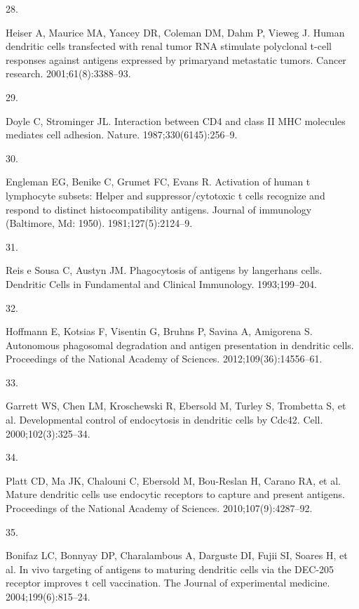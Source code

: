 \documentclass[
]{article}
\newlength{\cslhangindent}
\newlength{\csllabelwidth}
\newenvironment{CSLReferences}[2] %
 {\begin{list}{}{%
  \setlength{\itemindent}{0pt}
  \setlength{\leftmargin}{0pt}
  \setlength{\parsep}{0pt}
  \ifodd #1
   \setlength{\leftmargin}{\cslhangindent}
   \setlength{\itemindent}{-1\cslhangindent}
  \fi
  \setlength{\itemsep}{#2\baselineskip}}}
 {\end{list}}
\newcommand{\CSLLeftMargin}[1]{\parbox[t]{\csllabelwidth}{\strut#1\strut}}
\newcommand{\CSLRightInline}[1]{\parbox[t]{\linewidth - \csllabelwidth}{\strut#1\strut}}
\begin{document}
\begin{CSLReferences}{0}{1}
\CSLLeftMargin{28. }%
\CSLRightInline{Heiser A, Maurice MA, Yancey DR, Coleman DM, Dahm P,
Vieweg J. Human dendritic cells transfected with renal tumor RNA
stimulate polyclonal t-cell responses against antigens expressed by
primaryand metastatic tumors. Cancer research. 2001;61(8):3388--93. }

\CSLLeftMargin{29. }%
\CSLRightInline{Doyle C, Strominger JL. Interaction between CD4 and
class II MHC molecules mediates cell adhesion. Nature.
1987;330(6145):256--9. }

\CSLLeftMargin{30. }%
\CSLRightInline{Engleman EG, Benike C, Grumet FC, Evans R. Activation of
human t lymphocyte subsets: Helper and suppressor/cytotoxic t cells
recognize and respond to distinct histocompatibility antigens. Journal
of immunology (Baltimore, Md: 1950). 1981;127(5):2124--9. }

\CSLLeftMargin{31. }%
\CSLRightInline{Reis e Sousa C, Austyn JM. Phagocytosis of antigens by
langerhans cells. Dendritic Cells in Fundamental and Clinical
Immunology. 1993;199--204. }

\CSLLeftMargin{32. }%
\CSLRightInline{Hoffmann E, Kotsias F, Visentin G, Bruhns P, Savina A,
Amigorena S. Autonomous phagosomal degradation and antigen presentation
in dendritic cells. Proceedings of the National Academy of Sciences.
2012;109(36):14556--61. }

\CSLLeftMargin{33. }%
\CSLRightInline{Garrett WS, Chen LM, Kroschewski R, Ebersold M, Turley
S, Trombetta S, et al. Developmental control of endocytosis in dendritic
cells by Cdc42. Cell. 2000;102(3):325--34. }

\CSLLeftMargin{34. }%
\CSLRightInline{Platt CD, Ma JK, Chalouni C, Ebersold M, Bou-Reslan H,
Carano RA, et al. Mature dendritic cells use endocytic receptors to
capture and present antigens. Proceedings of the National Academy of
Sciences. 2010;107(9):4287--92. }

\CSLLeftMargin{35. }%
\CSLRightInline{Bonifaz LC, Bonnyay DP, Charalambous A, Darguste DI,
Fujii SI, Soares H, et al. In vivo targeting of antigens to maturing
dendritic cells via the DEC-205 receptor improves t cell vaccination.
The Journal of experimental medicine. 2004;199(6):815--24. }


\end{CSLReferences}
\end{document}
